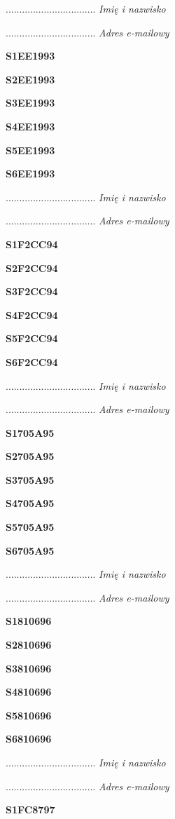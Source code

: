 .................................
\textit{Imię i nazwisko}

.................................
\textit{Adres e-mailowy}

\Large \textbf{S1EE1993}

\Large \textbf{S2EE1993}

\Large \textbf{S3EE1993}

\Large \textbf{S4EE1993}

\Large \textbf{S5EE1993}

\Large \textbf{S6EE1993}

.................................
\textit{Imię i nazwisko}

.................................
\textit{Adres e-mailowy}

\Large \textbf{S1F2CC94}

\Large \textbf{S2F2CC94}

\Large \textbf{S3F2CC94}

\Large \textbf{S4F2CC94}

\Large \textbf{S5F2CC94}

\Large \textbf{S6F2CC94}

.................................
\textit{Imię i nazwisko}

.................................
\textit{Adres e-mailowy}

\Large \textbf{S1705A95}

\Large \textbf{S2705A95}

\Large \textbf{S3705A95}

\Large \textbf{S4705A95}

\Large \textbf{S5705A95}

\Large \textbf{S6705A95}

.................................
\textit{Imię i nazwisko}

.................................
\textit{Adres e-mailowy}

\Large \textbf{S1810696}

\Large \textbf{S2810696}

\Large \textbf{S3810696}

\Large \textbf{S4810696}

\Large \textbf{S5810696}

\Large \textbf{S6810696}

.................................
\textit{Imię i nazwisko}

.................................
\textit{Adres e-mailowy}

\Large \textbf{S1FC8797}

